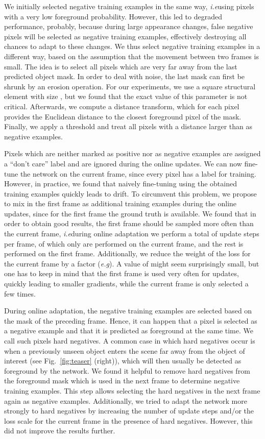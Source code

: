 \documentclass{bmvc2k}
\def\eg{\emph{e.g}\bmvaOneDot}
\def\ie{\emph{i.e}\bmvaOneDot}
\begin{document}
We initially selected negative training examples in the same way, \ie using pixels with a very low foreground probability. However, this led to degraded performance, probably, because during large appearance changes, false negative pixels will be selected as negative training examples, effectively destroying all chances to adapt to these changes. We thus select negative training examples in a different way, based on the assumption that the movement between two frames is small. The idea is to select all pixels which are very far away from the last predicted object mask. In order to deal with noise, the last mask can first be shrunk by an erosion operation. For our experiments, we use a square structural element with size , but we found that the exact value of this parameter is not critical.
Afterwards, we compute a distance transform, which for each pixel provides the Euclidean distance to the closest foreground pixel of the mask. Finally, we apply a threshold  and treat all pixels with a distance larger than  as negative examples.


Pixels which are neither marked as positive nor as negative examples are assigned a ``don't care'' label and are ignored during the online updates. We can now fine-tune the network on the current frame, since every pixel has a label for training. However, in practice, we found that naively fine-tuning using the obtained training examples quickly leads to drift.
To circumvent this problem, we propose to mix in the first frame as additional training examples during the online updates, since for the first frame the ground truth is available. 
We found that in order to obtain good results, the first frame should be sampled more often than the current frame, \ie during online adaptation we perform a total of  update steps per frame, of which only  are performed on the current frame, and the rest is performed on the first frame. Additionally, we reduce the weight of the loss for the current frame by a factor  (\eg ). A value of  might seem surprisingly small, but one has to keep in mind that the first frame is used very often for updates, quickly leading to smaller gradients, while the current frame is only selected a few times.

During online adaptation, the negative training examples are selected based on the mask of the preceding frame. Hence, it can happen that a pixel is selected as a negative example and that it is predicted as foreground at the same time. We call such pixels hard negatives. A common case  in which hard negatives occur is when a previously unseen object enters the scene far away from the object of interest (see Fig.~\ref{fig:teaser} (right)), which will then usually be detected as foreground by the network.
We found it helpful to remove hard negatives from the foreground mask which is used in the next frame to determine negative training examples. This step allows selecting the hard negatives in the next frame again as negative examples.
Additionally, we tried to adapt the network more strongly to hard negatives by increasing the number of update steps and/or the loss scale for the current frame in the presence of hard negatives. However, this did not improve the results further.
\end{document}
